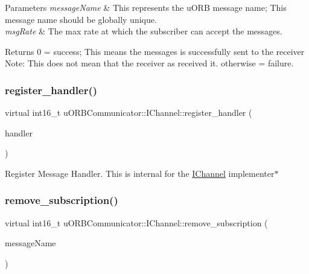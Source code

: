 \begin{DoxyParams}{Parameters}
{\em message\+Name} & This represents the u\+O\+RB message name; This message name should be globally unique. \\
\hline
{\em msg\+Rate} & The max rate at which the subscriber can accept the messages. \\
\hline
\end{DoxyParams}
\begin{DoxyReturn}{Returns}
0 = success; This means the messages is successfully sent to the receiver Note\+: This does not mean that the receiver as received it. otherwise = failure. 
\end{DoxyReturn}
\mbox{\label{classuORBCommunicator_1_1IChannel_aba1c6e430848e447334c5be5c06e1d14}} 
\subsubsection{\texorpdfstring{register\+\_\+handler()}{register\_handler()}}
{\footnotesize\ttfamily virtual int16\+\_\+t u\+O\+R\+B\+Communicator\+::\+I\+Channel\+::register\+\_\+handler (\begin{DoxyParamCaption}\item[{\hyperlink{classuORBCommunicator_1_1IChannelRxHandler}{u\+O\+R\+B\+Communicator\+::\+I\+Channel\+Rx\+Handler} $\ast$}]{handler }\end{DoxyParamCaption})\hspace{0.3cm}{\ttfamily [pure virtual]}}

Register Message Handler. This is internal for the \hyperlink{classuORBCommunicator_1_1IChannel}{I\+Channel} implementer$\ast$ \mbox{\label{classuORBCommunicator_1_1IChannel_a74420541552346f0367d802b5c61714a}} 
\subsubsection{\texorpdfstring{remove\+\_\+subscription()}{remove\_subscription()}}
{\footnotesize\ttfamily virtual int16\+\_\+t u\+O\+R\+B\+Communicator\+::\+I\+Channel\+::remove\+\_\+subscription (\begin{DoxyParamCaption}\item[{const char $\ast$}]{message\+Name }\end{DoxyParamCaption})\hspace{0.3cm}{\ttfamily [pure virtual]}}



